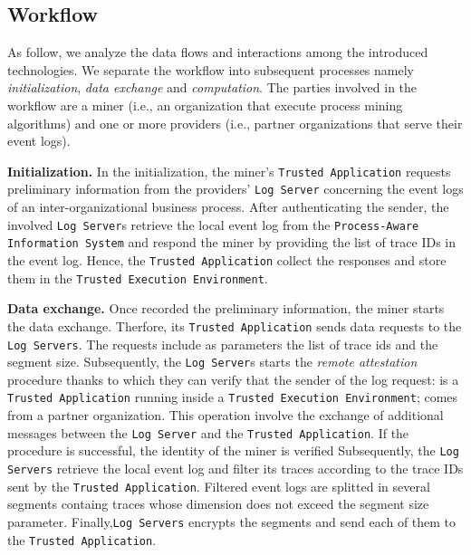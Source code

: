 \subsection{Workflow}
As follow, we analyze the data flows and interactions among the introduced technologies. We separate the workflow into subsequent processes namely \textit{initialization}, \textit{data exchange} and \textit{computation}.
The parties involved in the workflow are a miner (i.e., an organization that execute process mining algorithms) and one or more providers (i.e., partner organizations that serve their event logs). %

\textbf{Initialization.} In the initialization, the miner's \texttt{Trusted Application} requests preliminary information from the providers' \texttt{Log Server} concerning the event logs of an inter-organizational business process. After authenticating the sender, the involved \texttt{Log Server}s retrieve the local event log from the \texttt{Process-Aware Information System} and respond the miner by providing the list of trace IDs in the event log. Hence, the \texttt{Trusted Application} collect the responses and store them in the \texttt{Trusted Execution Environment}.

\textbf{Data exchange.} Once recorded the preliminary information, the miner starts the data exchange. Therfore, its \texttt{Trusted Application} sends data requests to the \texttt{Log Servers}. The requests include as parameters the list of trace ids and the segment size. Subsequently, the \texttt{Log Server}s starts the \textit{remote attestation} procedure thanks to which they can verify that the sender of the log request: is a \texttt{Trusted Application} running inside a \texttt{Trusted Execution Environment}; comes from a partner organization. This operation involve the exchange of additional messages between the \texttt{Log Server} and the \texttt{Trusted Application}. If the procedure is successful, the identity of the miner is verified %
Subsequently, the \texttt{Log Servers} retrieve the local event log and filter its traces according to the trace IDs sent by the \texttt{Trusted Application}. Filtered event logs are splitted in several segments containg traces whose dimension does not exceed the segment size parameter. Finally,\texttt{Log Servers} encrypts the segments and send each of them to the \texttt{Trusted Application}.

